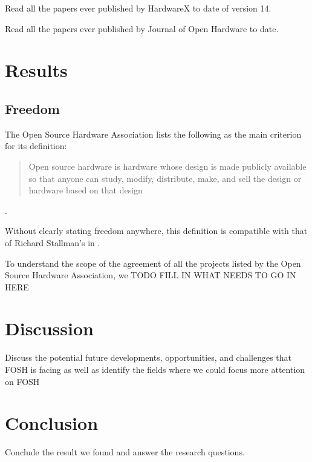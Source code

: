 \documentclass{article}
\begin{document}
Read all the papers ever published by HardwareX to date of version 14. 

Read all the papers ever published by Journal of Open Hardware to date.

\section{Results}

\subsection{Freedom}
The Open Source Hardware Association lists the following as the main criterion for its definition:
\begin{quote}
Open source hardware is hardware whose design is made publicly available so that anyone can study, modify, distribute, make, and sell the design or hardware based on that design 
\end{quote}
\cite{OSH_association_def}.

Without clearly stating freedom anywhere, this definition is compatible with that of Richard Stallman's in \cite{b0_stallman}.

To understand the scope of the agreement of all the projects listed by the Open Source Hardware Association, we 
TODO FILL IN WHAT NEEDS TO GO IN HERE


\section{Discussion}
Discuss the potential future developments, opportunities, and challenges that FOSH is facing as well as identify the fields where we could focus more attention on FOSH  
\section{Conclusion}
Conclude the result we found and answer the research questions.
\nocite{*}
\printbibliography
\end{document}
